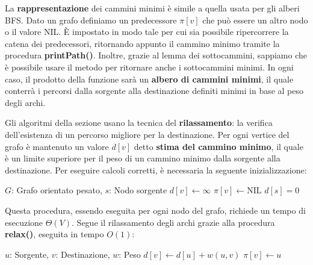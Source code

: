 \noindent La \textbf{rappresentazione} dei cammini minimi è simile a quella usata per gli alberi BFS. Dato un grafo definiamo un predecessore $\pi[v]$
che può essere un altro nodo o il valore NIL. È impostato in modo tale per cui sia possibile ripercorrere la catena dei predecessori, ritornando
appunto il cammino minimo tramite la procedura \textbf{printPath()}. Inoltre, grazie al lemma dei sottocammini, sappiamo che è possibile usare il
metodo per ritornare anche i sottocammini minimi. In ogni caso, il prodotto della funzione sarà un \textbf{albero di cammini minimi}, il quale conterrà
i percorsi dalla sorgente alla destinazione definiti minimi in base al peso degli archi.\par
Gli algoritmi della sezione usano la tecnica del \textbf{rilassamento}: la verifica dell'esistenza di un percorso migliore per la destinazione. Per
ogni vertice del grafo è mantenuto un valore $d[v]$ detto \textbf{stima del cammino minimo}, il quale è un limite superiore per il peso di un cammino
minimo dalla sorgente alla destinazione. Per eseguire calcoli corretti, è necessaria la seguente inizializzazione:
\begin{algorithm}[h]
	\caption{initializeSingleSource(G, s)}
	\begin{algorithmic}[i]
		\Require $G$: Grafo orientato pesato, $s$: Nodo sorgente
		\State $d[v]\gets \infty$
		\State $\pi[v]\gets \text{NIL}$
		\EndFor
		\State $d[s] = 0$
	\end{algorithmic}
\end{algorithm}

\noindent Questa procedura, essendo eseguita per ogni nodo del grafo, richiede un tempo di esecuzione $\Theta(V)$. Segue il rilassamento degli archi
grazie alla procedura \textbf{relax()}, eseguita in tempo $O(1)$:
\begin{algorithm}[h]
	\caption{relax(u, v, w)}
	\begin{algorithmic}[i]
		\Require $u$: Sorgente, $v$: Destinazione, $w$: Peso
		 
		\State $d[v]\gets d[u] + w(u,v)$ 
		\State $\pi[v]\gets u$
		\EndIf
	\end{algorithmic}
\end{algorithm}

